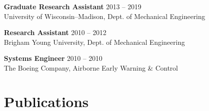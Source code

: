 \documentclass[letterpaper, 10pt]{article}
\begin{document}
\textbf{Graduate Research Assistant}
\hfill 2013 -- 2019\\ %
University of Wisconsin–Madison, Dept. of Mechanical Engineering  %
\medskip

\textbf{Research Assistant}
\hfill 2010 -- 2012\\ %
Brigham Young University, Dept. of Mechanical Engineering %
\medskip

\textbf{Systems Engineer}
\hfill 2010 -- 2010\\ %
The Boeing Company, Airborne Early Warning \& Control %

\section{Publications}

\end{document}
